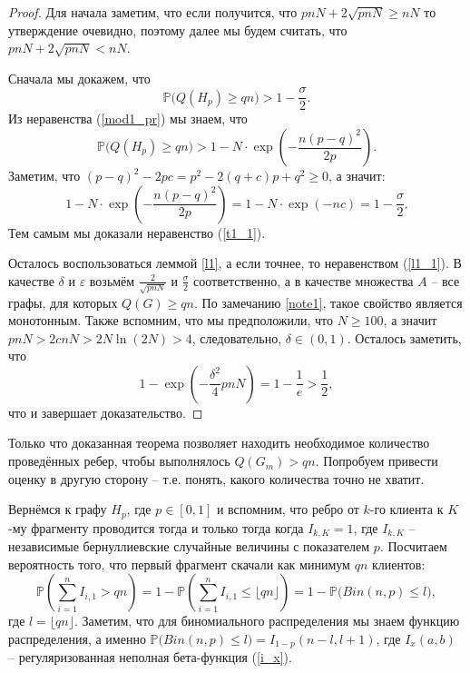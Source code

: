 \documentclass{matmex-diploma-custom}
\newcommand{\PRob}{\mathbb P}
\newcommand{\leqs}{\leqslant}
\newcommand{\geqs}{\geqslant}
\newcommand{\eps}{\varepsilon}
\theoremstyle{named}
\begin{document}
\begin{proof}
Для начала заметим, что если получится, что $pnN + 2\sqrt{pnN} \geqs nN$ то утверждение очевидно, 
поэтому далее мы будем считать, что $pnN + 2\sqrt{pnN} < nN$.

Сначала мы докажем, что 
\begin{equation}\label{t1_1}
\PRob\big(Q(H_p) \geqs qn \big) > 1 - \frac\sigma{2}.
\end{equation}
Из неравенства (\ref{mod1_pr}) мы знаем, что 
\begin{equation} \label{t1_t3_1}
\PRob\big(Q(H_p) \geqs qn \big) > 1 - N \cdot \exp\left(- \frac{n (p-q)^2}{2p} \right).
\end{equation}
Заметим, что $(p-q)^2 - 2pc = p^2 -2(q + c)p + q^2 \geqs 0$, а значит:
\begin{equation}
1 - N \cdot \exp\left(- \frac{n (p-q)^2}{2p} \right) = 1 - N \cdot \exp(-nc) = 1 - \frac\sigma{2}.
\end{equation}
Тем самым мы доказали неравенство (\ref{t1_1}).

Осталось воспользоваться леммой \ref{l1}, а если точнее, то неравенством (\ref{l1_1}). 
В качестве $\delta$ и $\eps$ возьмём $\frac{2}{\sqrt{pnN}}$ и $\frac\sigma{2}$ соответственно, 
а в качестве множества $A$ -- все графы, для которых $Q(G) \geqs qn$.
По замечанию \ref{note1}, такое свойство является монотонным.
Также вспомним, что мы предположили, что $N \geqs 100$, а значит $pnN > 2cnN> 2N\ln(2N) > 4$, 
следовательно, $\delta \in (0,1)$. 
Осталось заметить, что 
\begin{equation}
1 - \exp\left(-\frac{\delta^2}{4}pnN\right) = 1 - \frac{1}{e} > \frac{1}{2},
\end{equation}
что и завершает доказательство.
\end{proof}

\bigskip

Только что доказанная теорема позволяет находить необходимое количество проведённых ребер, чтобы выполнялось $Q(G_m) > qn$.
Попробуем привести оценку в другую сторону -- т.е. понять, какого количества точно не хватит.

Вернёмся к графу $H_p$, где $p \in [0,1]$ и вспомним, что ребро от $k$-го клиента к $K$-му фрагменту проводится тогда и только тогда
когда $I_{k,K} = 1$, где $I_{k,K}$ -- независимые бернуллиевские случайные величины с показателем $p$. 
Посчитаем вероятность того, что первый фрагмент скачали как минимум $qn$ клиентов:
\begin{equation}
\PRob\left(\sum_{i=1}^n I_{i,1} > qn\right) 
	= 
1 - \PRob\left(\sum_{i=1}^n I_{i,1} \leqs \lfloor qn \rfloor\right) 
	= 
1 - \PRob\big(Bin(n, p) \leqs l\big),
\end{equation}
где $l = \lfloor qn \rfloor$. Заметим, что для биномиального распределения мы знаем функцию распределения, 
а именно $\PRob\big(Bin(n, p) \leqs l\big) = I_{1-p}(n-l, l+1)$, где $I_x(a,b)$ -- регуляризованная неполная бета-функция (\ref{i_x}).
\end{document}
